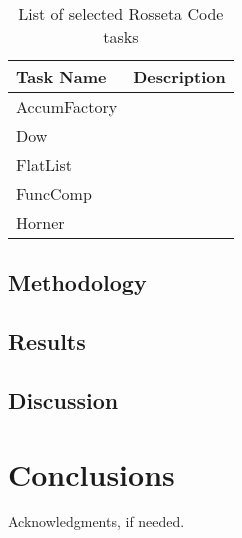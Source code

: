 \documentclass[10pt]{sigplanconf}
\begin{document}
\begin{table}
\begin{center}
\begin{tabular}{ l p{4cm}}
 \hline
Task Name & Description\\
\hline
AccumFactory & \\
Dow & \\
FlatList & \\
FuncComp & \\
Horner & \\
\hline
\end{tabular}
\end{center}
\caption{List of selected Rosseta Code tasks}
\label{tab:Tasks}	
\end{table}

\subsection{Methodology}

\subsection{Results}

\subsection{Discussion}

\section{Conclusions}

\acks

Acknowledgments, if needed.








\end{document}
